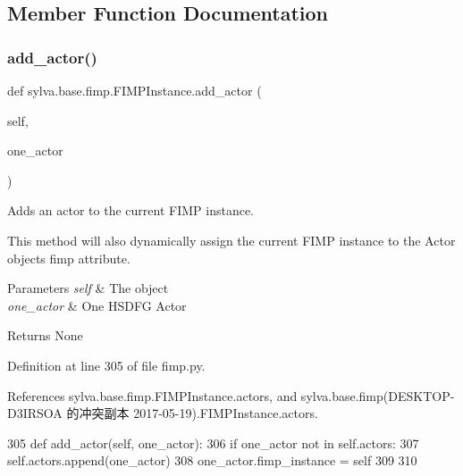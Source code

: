 \subsection{Member Function Documentation}
\mbox{\label{classsylva_1_1base_1_1fimp_1_1_f_i_m_p_instance_ac20e7fe05ac4f1bfacf020a57150b0ee}} 
\subsubsection{\texorpdfstring{add\+\_\+actor()}{add\_actor()}}
{\footnotesize\ttfamily def sylva.\+base.\+fimp.\+F\+I\+M\+P\+Instance.\+add\+\_\+actor (\begin{DoxyParamCaption}\item[{}]{self,  }\item[{}]{one\+\_\+actor }\end{DoxyParamCaption})}



Adds an actor to the current F\+I\+MP instance. 

This method will also dynamically assign the current F\+I\+MP instance to the Actor object\textquotesingle{}s {\ttfamily fimp} attribute.


\begin{DoxyParams}{Parameters}
{\em self} & The object \\
\hline
{\em one\+\_\+actor} & One H\+S\+D\+FG Actor\\
\hline
\end{DoxyParams}
\begin{DoxyReturn}{Returns}
None 
\end{DoxyReturn}


Definition at line 305 of file fimp.\+py.



References sylva.\+base.\+fimp.\+F\+I\+M\+P\+Instance.\+actors, and sylva.\+base.\+fimp(\+D\+E\+S\+K\+T\+O\+P-\/\+D3\+I\+R\+S\+O\+A 的冲突副本 2017-\/05-\/19).\+F\+I\+M\+P\+Instance.\+actors.


\begin{DoxyCode}
305     \textcolor{keyword}{def }add\_actor(self, one\_actor):
306         \textcolor{keywordflow}{if} one\_actor \textcolor{keywordflow}{not} \textcolor{keywordflow}{in} self.actors:
307             self.actors.append(one\_actor)
308             one\_actor.fimp\_instance = self
309 
310 
\end{DoxyCode}


